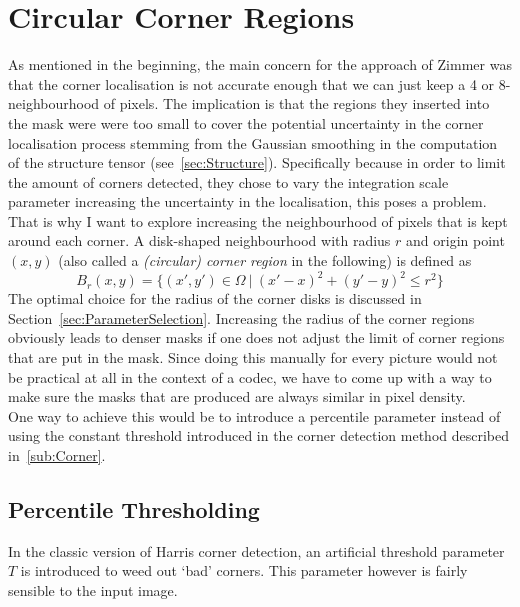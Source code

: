 \section{Circular Corner Regions}\label{sec:Contribution}
As mentioned in the beginning, the main concern for the approach of Zimmer\cite{zimmer07} was that the 
corner localisation is not accurate enough that we can just keep a 4 or 8-neighbourhood 
of pixels. The implication is that the regions they inserted into the mask were were too small to
cover the potential uncertainty in the corner localisation process stemming from the Gaussian
smoothing in the computation of the structure tensor (see~\ref{sec:Structure}). Specifically
because in order to limit the amount of corners detected, they chose to vary the integration scale
parameter increasing the uncertainty in the localisation, this poses a problem.
That is why I want to explore increasing the neighbourhood of pixels that is kept around each
corner. A disk-shaped neighbourhood with radius $r$ and origin point $(x, y)$ (also called a
\textit{(circular) corner region} in the following) is defined as 
\begin{equation}
    B_r(x, y) = \lbrace (x',y') \in \Omega\ \vert\ {(x'-x)}^2 + {(y'-y)}^2 \leq r^2\rbrace
\end{equation}
The optimal choice for the radius of the corner disks is discussed in
Section~\ref{sec:ParameterSelection}.
Increasing the radius of the corner regions obviously leads to denser masks if one does not adjust
the limit of corner regions that are put in the mask. Since doing this manually for every picture
would not be practical at all in the context of a codec, we have to come up with a way to make sure
the masks that are produced are always similar in pixel density.\\
One way to achieve this would be to introduce a percentile parameter instead of using the constant
threshold introduced in the corner detection method described in~\ref{sub:Corner}.

\subsection{Percentile Thresholding}\label{sub:Percentile}
In the classic version of Harris corner detection, an artificial threshold parameter $T$ is
introduced to weed out `bad' corners. This parameter however is fairly sensible to the input image.

